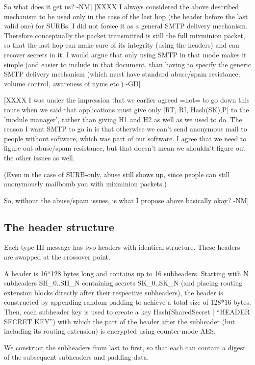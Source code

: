       So what does it get us?  -NM]  
[XXXX I always considered the above described mechanism to be used
only in the case of the last hop (the header before the last valid
one) for SURBs. I did not forsee it as a general SMTP delivery
mechanism. Therefore conceptually the packet transmitted is still the
full mixminion packet, so that the last hop can make sure of its
integrity (using the headers) and can recover secrets in it. I would
argue that only using SMTP in that mode makes it simple (and easier to
include in that document, than having to specify the generic SMTP
delivery mechanism (which must have standard abuse/spam resistance,
volume control, awareness of nyms etc.) -GD]

[XXXX I was under the impression that we earlier agreed =not= to go
 down this route when we said that applications must give only [RT,
 RI, Hash(SK),P] to the 'module manager', rather than giving H1 and H2
 as well as we used to do.  The reason I want SMTP to go in is that
 otherwise we can't send anonymous mail to people without software,
 which was part of our software.  I agree that we need to figure out
 abuse/spam resistance, but that doesn't mean we shouldn't figure out
 the other issues as well.
 
 (Even in the case of SURB-only, abuse still shows up, since people
 can still anonymously mailbomb you with mixminion packets.)

 So, without the abuse/spam issues, is what I propose above basically
 okay? -NM]

\subsection{The header structure}

Each type III message has two headers with identical structure. These
headers are swapped at the crossover point.

A header is 16*128 bytes long and contains up to 16
subheaders. Starting with N subheaders SH_0..SH_N containing secrets
SK_0..SK_N (and placing routing extension blocks directly after their
respective subheaders), the header is constructed by appending 
random padding to achieve a total size
of 128*16 bytes. Then, each subheader key is used to create a key
Hash(SharedSecret | ``HEADER SECRET KEY'') with which the part of the
header after the subheader (but including its routing extension) is
encrypted using counter-mode AES.

We construct the subheaders from last to first, so that each can contain
a digest of the subsequent subheaders and padding data.

